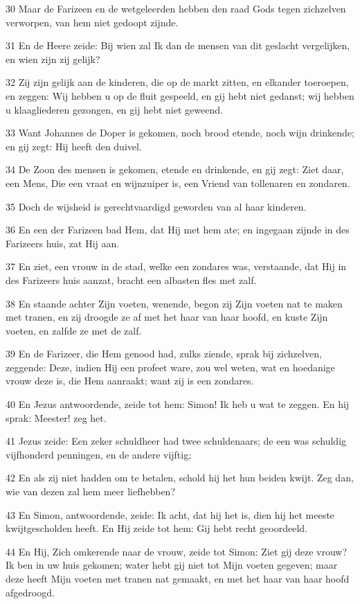 \par 30 Maar de Farizeen en de wetgeleerden hebben den raad Gods tegen zichzelven verworpen, van hem niet gedoopt zijnde.
\par 31 En de Heere zeide: Bij wien zal Ik dan de mensen van dit geslacht vergelijken, en wien zijn zij gelijk?
\par 32 Zij zijn gelijk aan de kinderen, die op de markt zitten, en elkander toeroepen, en zeggen: Wij hebben u op de fluit gespeeld, en gij hebt niet gedanst; wij hebben u klaagliederen gezongen, en gij hebt niet geweend.
\par 33 Want Johannes de Doper is gekomen, noch brood etende, noch wijn drinkende; en gij zegt: Hij heeft den duivel.
\par 34 De Zoon des mensen is gekomen, etende en drinkende, en gij zegt: Ziet daar, een Mens, Die een vraat en wijnzuiper is, een Vriend van tollenaren en zondaren.
\par 35 Doch de wijsheid is gerechtvaardigd geworden van al haar kinderen.
\par 36 En een der Farizeen bad Hem, dat Hij met hem ate; en ingegaan zijnde in des Farizeers huis, zat Hij aan.
\par 37 En ziet, een vrouw in de stad, welke een zondares was, verstaande, dat Hij in des Farizeers huis aanzat, bracht een albasten fles met zalf.
\par 38 En staande achter Zijn voeten, wenende, begon zij Zijn voeten nat te maken met tranen, en zij droogde ze af met het haar van haar hoofd, en kuste Zijn voeten, en zalfde ze met de zalf.
\par 39 En de Farizeer, die Hem genood had, zulks ziende, sprak bij zichzelven, zeggende: Deze, indien Hij een profeet ware, zou wel weten, wat en hoedanige vrouw deze is, die Hem aanraakt; want zij is een zondares.
\par 40 En Jezus antwoordende, zeide tot hem: Simon! Ik heb u wat te zeggen. En hij sprak: Meester! zeg het.
\par 41 Jezus zeide: Een zeker schuldheer had twee schuldenaars; de een was schuldig vijfhonderd penningen, en de andere vijftig;
\par 42 En als zij niet hadden om te betalen, schold hij het hun beiden kwijt. Zeg dan, wie van dezen zal hem meer liefhebben?
\par 43 En Simon, antwoordende, zeide: Ik acht, dat hij het is, dien hij het meeste kwijtgescholden heeft. En Hij zeide tot hem: Gij hebt recht geoordeeld.
\par 44 En Hij, Zich omkerende naar de vrouw, zeide tot Simon: Ziet gij deze vrouw? Ik ben in uw huis gekomen; water hebt gij niet tot Mijn voeten gegeven; maar deze heeft Mijn voeten met tranen nat gemaakt, en met het haar van haar hoofd afgedroogd.
